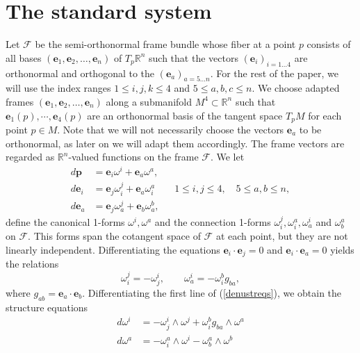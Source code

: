 \documentclass[12pt,reqno]{amsart}
\theoremstyle{definition}
\theoremstyle{remark}
\begin{document}
\section{The standard system}\label{stdsection}
Let ${\mathscr F}$ be the semi-orthonormal frame bundle whose fiber at a point $p$ consists of all bases
$({\mathbf e}_1,{\mathbf e}_2, \dots, {\mathbf e}_n)$ of $T_p{\mathbb R}^{n}$ such that the vectors $({\mathbf e}_i)_{i=1\dots 4}$ are orthonormal
and orthogonal to the $({\mathbf e}_a)_{a=5\dots n}$. For the rest of the paper, we will use the index ranges
$1\leq i,j,k\leq 4$ and $5\leq a,b,c\leq n$. We choose adapted frames $({\mathbf e}_1,{\mathbf e}_2, \dots, {\mathbf e}_n)$
along a submanifold $M^4\subset {\mathbb R}^n$ such that ${\mathbf e}_1(p), \cdots, {\mathbf e}_4(p)$ are an orthonormal basis
of the tangent space $T_pM$ for each point $p\in M$. Note that we will not necessarily choose the vectors
${\mathbf e}_a$ to be orthonormal, as later on we will adapt them accordingly. The frame vectors are regarded as
${\mathbb R}^{n}$-valued functions on the frame ${\mathscr F}$. We let
\begin{equation}\label{denustreqs}
\begin{aligned}
d{\mathbf p} &= {\mathbf e}_i {\omega}^i + {\mathbf e}_a \omega^a,\\
d{\mathbf e}_i &= {\mathbf e}_j \omega^j_i + {\mathbf e}_a \omega^a_i \quad \quad  1\leq i,j\leq 4, \quad  5\leq a,b\leq n,\\
d{\mathbf e}_a &= {\mathbf e}_j\omega^j_a + {\mathbf e}_b \omega^b_a,
\end{aligned}
\end{equation}
define the canonical 1-forms $\omega^i, \omega ^a$ and the connection 1-forms $\omega_i^j, \omega^a_i, \omega^i_a$ and $\omega_b^a$
on ${\mathscr F}$.
This forms span the cotangent space of ${\mathscr F}$ at each point, but they are not linearly independent.
Differentiating the equations  ${\mathbf e}_i\cdot {\mathbf e}_j=0$ and ${\mathbf e}_i\cdot {\mathbf e}_a=0$ yields  the relations
\begin{equation}\label{symmetries}
\omega_i^j=-\omega _j^i, \qquad  \omega_a^i=-\omega_i^b  g_{ba},
\end{equation}
 where $g_{ab}={\mathbf e}_a\cdot {\mathbf e}_b$. Differentiating the first line of (\ref {denustreqs}), we obtain the structure equations
\begin{equation}\label{canonicalstreqs}
\begin{aligned}
 d\omega^i&=-\omega_j^i\wedge \omega^j+\omega^b_i g_{ba}\wedge\omega^a\\
 d\omega^a&=-\omega^a_i\wedge \omega^i-\omega^a_b\wedge \omega^b
\end{aligned}
\end{equation}
\end{document}
